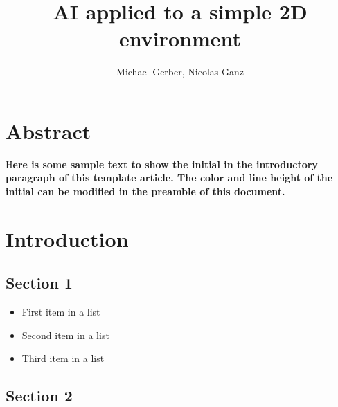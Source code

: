 \documentclass[DIV=calc, paper=a4, fontsize=11pt, twocolumn]{scrreprt}	 %
\title{AI applied to a simple 2D environment} %
\author{Michael Gerber, Nicolas Ganz } %
\date{} %
\newcommand{\initial}[1]{ %
  \lettrine[lines=3,lhang=0.3,nindent=0em]{
    \color{DarkGoldenrod}
    {\textsf{#1}}}{}}
\begin{document}
        \begin{titlepage}
          \thispagestyle{empty}
          \maketitle %
        \end{titlepage}


        \tableofcontents

        \chapter{Abstract}
        \initial{H}\textbf{ere is some sample text to show the initial in the introductory paragraph of this template article. The color and line height of the initial can be modified in the preamble of this document.}


        \chapter{Introduction}



        \section{Section 1}


        \begin{itemize}
          \item First item in a list 
          \item Second item in a list 
          \item Third item in a list
        \end{itemize}



        \section{Section 2}
\end{document}
